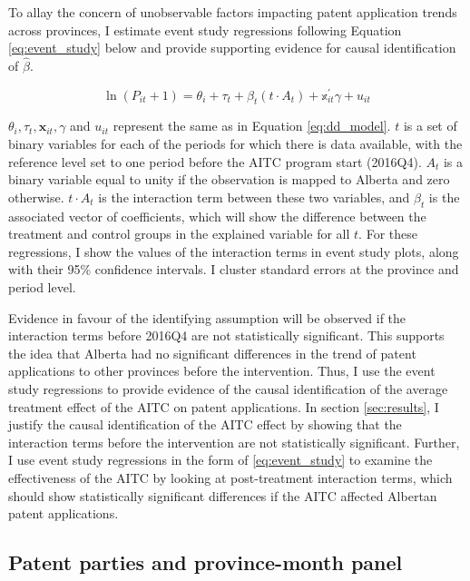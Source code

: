 \documentclass[../main.tex]{subfiles}
\begin{document}
To allay the concern of unobservable factors impacting patent application trends across provinces, I estimate event study regressions following Equation \ref{eq:event_study} below and provide supporting evidence for causal identification of $\hat{\beta}$.

\begin{equation}
    \label{eq:event_study}
   \ln(P_{it} + 1) = \theta_i + \tau_t + \beta_t (t \cdot A_t) + \mathbb{x}_{it}^{'}\gamma + u_{it}
\end{equation}

$\theta_i, \tau_t, \mathbf{x}_{it}, \gamma$ and $u_{it}$ represent the same as in Equation \ref{eq:dd_model}. $t$ is a set of binary variables for each of the periods for which there is data available, with the reference level set to one period before the AITC program start (2016Q4). $A_t$ is a binary variable equal to unity if the observation is mapped to Alberta and zero otherwise. $t\cdot A_t$ is the interaction term between these two variables, and $\beta_t$ is the associated vector of coefficients, which will show the difference between the treatment and control groups in the explained variable for all $t$. For these regressions, I show the values of the interaction terms in event study plots, along with their 95\% confidence intervals. I cluster standard errors at the province and period level.

Evidence in favour of the identifying assumption will be observed if the interaction terms before 2016Q4 are not statistically significant. This supports the idea that Alberta had no significant differences in the trend of patent applications to other provinces before the intervention. Thus, I use the event study regressions to provide evidence of the causal identification of the average treatment effect of the AITC on patent applications. In section \ref{sec:results}, I justify the causal identification of the AITC effect by showing that the interaction terms before the intervention are not statistically significant. Further, I use event study regressions in the form of \ref{eq:event_study} to examine the effectiveness of the AITC by looking at post-treatment interaction terms, which should show statistically significant differences if the AITC affected Albertan patent applications.

\subsection{Patent parties and province-month panel}
\end{document}
